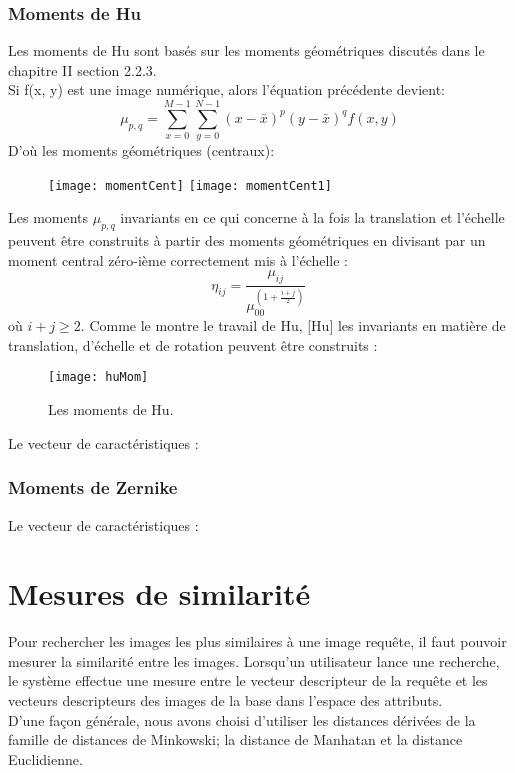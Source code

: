 \subsubsection{Moments de Hu}
Les moments de Hu sont basés sur les moments géométriques discutés dans le chapitre II section 2.2.3.\\
Si ƒ(x, y) est une image numérique, alors l'équation précédente devient:
\begin{equation}
\mu_{p,q} = \sum_{x=0}^{M-1}\sum_{y=0}^{N-1} (x- \bar{x})^p (y-\bar{x})^q f(x, y)
\end{equation}
D'où les moments géométriques (centraux):
\begin{figure}[H]
	\texttt{[image: momentCent]} \texttt{[image: momentCent1]}
\end{figure}
Les moments $ \mu_{p,q} $ invariants en ce qui concerne à la fois la translation et l'échelle peuvent être construits à partir des moments géométriques en divisant par un moment central zéro-ième correctement mis à l'échelle :
\begin{equation}
\eta _{{ij}}={\frac  {\mu _{{ij}}}{\mu _{{00}}^{{\left(1+{\frac  {i+j}{2}}\right)}}}}\,\!
\end{equation}
où $ i + j \ge 2 $.
Comme le montre le travail de Hu, [Hu] les invariants en matière de translation, d'échelle et de rotation peuvent être construits :
\begin{figure}[H]
	\centering
	\texttt{[image: huMom]}
	\caption{Les moments de Hu.}
\end{figure}

Le vecteur de caractéristiques :
\subsubsection{Moments de Zernike}


Le vecteur de caractéristiques :
\section{Mesures de similarité}
Pour rechercher les images les plus similaires à une image requête, il faut pouvoir mesurer la similarité entre les images. Lorsqu’un utilisateur lance une recherche, le système effectue une mesure entre le vecteur descripteur de la requête et les vecteurs descripteurs des images de la base dans l’espace des attributs.\\

D'une façon générale, nous avons choisi d’utiliser les distances dérivées de la famille de distances de Minkowski; la distance de Manhatan et la distance Euclidienne.\\

